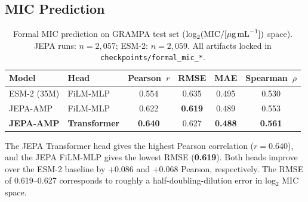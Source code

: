 \subsection{MIC Prediction}
\label{sec:res_mic}

\begin{table}[h]
\centering
\caption{Formal MIC prediction on GRAMPA test set
  ($\log_2(\text{MIC}/[\mu\text{g\,mL}^{-1}])$ space).
  JEPA runs: $n{=}2{,}057$; ESM-2: $n{=}2{,}059$.
  All artifacts locked in \texttt{checkpoints/formal\_mic\_*}.}
\label{tab:mic}
\begin{tabular}{llcccc}
\toprule
\textbf{Model} & \textbf{Head} & \textbf{Pearson~$r$} & \textbf{RMSE} & \textbf{MAE} & \textbf{Spearman~$\rho$} \\
\midrule
ESM-2 (35M)           & FiLM-MLP         & 0.554 & 0.635 & 0.495 & 0.530 \\
JEPA-AMP              & FiLM-MLP         & 0.622 & \textbf{0.619} & 0.489 & 0.553 \\
\textbf{JEPA-AMP}     & \textbf{Transformer} & \textbf{0.640} & 0.627 & \textbf{0.488} & \textbf{0.561} \\
\bottomrule
\end{tabular}
\end{table}

The JEPA Transformer head gives the highest Pearson correlation
($r=\mathbf{0.640}$), and the JEPA FiLM-MLP gives the lowest RMSE
(\textbf{0.619}).
Both heads improve over the ESM-2 baseline by $+0.086$ and $+0.068$
Pearson, respectively.
The RMSE of 0.619--0.627 corresponds to roughly a half-doubling-dilution error
in log$_2$ MIC space.

